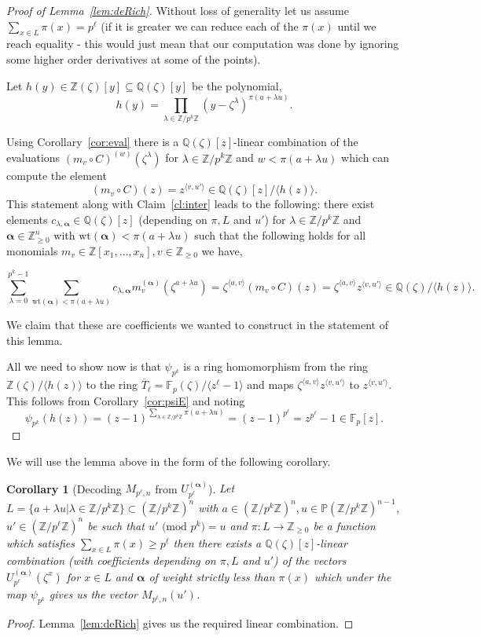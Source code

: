 \documentclass[11pt]{article}
\numberwithin{equation}{section}
\newtheorem{cor}[thm]{Corollary}
\def\F{{\mathbb{F}}}
\def\Q{{\mathbb{Q}}}
\def\Z{{\mathbb{Z}}}
\def\P{{\mathbb{P}}}
\def\balpha{{\bm \alpha}}
\begin{document}
\begin{proof}[Proof of Lemma~\ref{lem:deRich}]
Without loss of generality let us assume $\sum_{x\in L} \pi(x)=p^\ell$ (if it is greater we can reduce each of the $\pi(x)$ until we reach equality - this would just mean that our computation was done by ignoring some higher order derivatives at some of the points).

Let $h(y)\in \Z(\zeta)[y]\subseteq \Q(\zeta)[y]$ be the polynomial,
$$h(y)= \prod\limits_{\lambda \in \Z/p^k\Z}(y-\zeta^{\lambda})^{\pi(a+\lambda u)}.$$

Using Corollary~\ref{cor:eval} there is a $\Q(\zeta)[z]$-linear combination of the evaluations  $(m_v\circ C)^{(w)}(\zeta^\lambda)$ for $\lambda \in \Z/p^k\Z$ and $w<\pi(a+\lambda u)$ which can compute the element 
$$(m_v\circ C)(z)=z^{\langle v,u'\rangle} \in \Q(\zeta)[z]/\langle h(z)\rangle.$$ 
This statement along with Claim~\ref{cl:inter} leads to the following: there exist elements $c_{\lambda,\balpha} \in \Q(\zeta)[z]$ (depending on $\pi,L$ and $u'$) for $\lambda \in \Z/p^k\Z$ and $\balpha\in  \Z_{\ge 0}^n$ with $\text{wt}(\balpha)< \pi(a+\lambda u)$ such that the following holds for all monomials $m_v\in \Z[x_1,\hdots,x_n],v\in \Z_{\ge 0}$ we have,

$$\sum\limits_{\lambda =0}^{p^k-1}\sum\limits_{\text{wt}(\balpha) < \pi(a+\lambda u) }c_{\lambda,\balpha} m_v^{(\balpha)}(\zeta^{a+\lambda u})=\zeta^{\langle a,v\rangle} (m_v\circ C)(z)=\zeta^{\langle a,v\rangle}z^{\langle v,u'\rangle} \in \Q(\zeta)/\langle h(z)\rangle.$$

We claim that these are coefficients we wanted to construct in the statement of this lemma. 

All we need to show now is that $\psi_{p^k}$ is a ring homomorphism from the ring $\Z(\zeta)/\langle h(z)\rangle$ to the ring $\overline{T}_\ell=\F_p(\zeta)/\langle z^\ell -1\rangle$ and maps $\zeta^{\langle a,v\rangle}z^{\langle v,u'\rangle}$ to $z^{\langle v,u'\rangle}$. This follows from Corollary~\ref{cor:psiE} and noting 
$$\psi_{p^k}(h(z))=(z-1)^{\sum\limits_{\lambda \in\Z/p^k\Z} \pi(a+\lambda u)}=(z-1)^{p^\ell}=z^{p^\ell}-1\in \F_p[z].$$

\end{proof}

We will use the lemma above in the form of the following corollary.

\begin{cor}[Decoding $M_{p^\ell,n}$ from $U^{(\balpha)}_{p^\ell}$]\label{lem:decoding}
Let $L=\{a+\lambda u| \lambda \in \Z/p^k\Z\}\subset (\Z/p^k\Z)^n$ with $a\in (\Z/p^k\Z)^n,u\in \P (\Z/p^k\Z)^{n-1}$, $u'\in (\Z/p^\ell\Z)^n$ be such that {\em $u'\text{ (mod }p^k\text{)}=u$} and $\pi:L\rightarrow \Z_{\ge 0}$ be a function which satisfies $\sum_{x\in L} \pi(x) \ge p^\ell$ then there exists a $\Q(\zeta)[z]$-linear combination (with coefficients depending on $\pi,L$ and $u'$) of the vectors $U_{p^\ell}^{(\balpha)}(\zeta^x)$ for $x\in L$ and $\balpha$ of weight strictly less than $\pi(x)$ which under the map $\psi_{p^k}$ gives us the vector $M_{p^\ell,n}(u')$.
\end{cor}
\begin{proof}
Lemma~\ref{lem:deRich} gives us the required linear combination.
\end{proof}
\end{document}
